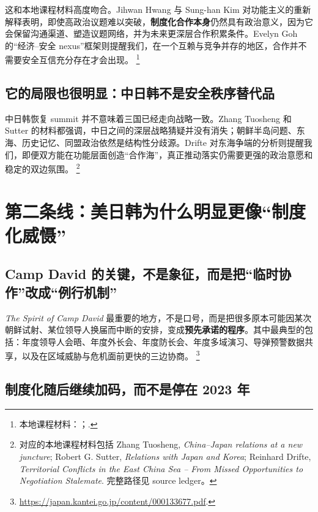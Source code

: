 \documentclass[a4paper]{article}
\begin{document}
这和本地课程材料高度吻合。Jihwan Hwang 与 Sung-han Kim 对功能主义的重新解释表明，即使高政治议题难以突破，\textbf{制度化合作本身}仍然具有政治意义，因为它会保留沟通渠道、塑造议题网络，并为未来更深层合作积累条件。Evelyn Goh 的“经济--安全 nexus”框架则提醒我们，在一个互赖与竞争并存的地区，合作并不需要安全互信充分存在才会出现。%
\footnote{本地课程材料：；.}

\subsection{它的局限也很明显：中日韩不是安全秩序替代品}

中日韩恢复 summit 并不意味着三国已经走向战略一致。Zhang Tuosheng 和 Sutter 的材料都强调，中日之间的深层战略猜疑并没有消失；朝鲜半岛问题、东海、历史记忆、同盟政治依然是结构性分歧源。Drifte 对东海争端的分析则提醒我们，即便双方能在功能层面创造“合作海”，真正推动落实仍需要更强的政治意愿和稳定的双边氛围。%
\footnote{对应的本地课程材料包括 Zhang Tuosheng, \textit{China--Japan relations at a new juncture}; Robert G. Sutter, \textit{Relations with Japan and Korea}; Reinhard Drifte, \textit{Territorial Conflicts in the East China Sea -- From Missed Opportunities to Negotiation Stalemate}. 完整路径见 source ledger。}

\section{第二条线：美日韩为什么明显更像“制度化威慑”}

\subsection{Camp David 的关键，不是象征，而是把“临时协作”改成“例行机制”}

\textit{The Spirit of Camp David} 最重要的地方，不是口号，而是把很多原本可能因某次朝鲜试射、某位领导人换届而中断的安排，变成\textbf{预先承诺的程序}。其中最典型的包括：年度领导人会晤、年度外长会、年度防长会、年度多域演习、导弹预警数据共享，以及在区域威胁与危机面前更快的三边协商。%
\footnote{\url{https://japan.kantei.go.jp/content/000133677.pdf}.}

\subsection{制度化随后继续加码，而不是停在 2023 年}
\end{document}
